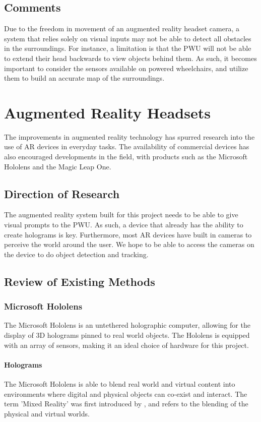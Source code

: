\subsection{Comments}
Due to the freedom in movement of an augmented reality headset camera, a system that relies solely on visual inputs may not be able to detect all obstacles in the surroundings. For instance, a limitation is that the PWU will not be able to extend their head backwards to view objects behind them. As such, it becomes important to consider the sensors available on powered wheelchairs, and utilize them to build an accurate map of the surroundings.

\section{Augmented Reality Headsets}
The improvements in augmented reality technology has spurred research into the use of AR devices in everyday tasks. The availability of commercial devices has also encouraged developments in the field, with products such as the Microsoft Hololens and the Magic Leap One.

\subsection{Direction of Research}
The augmented reality system built for this project needs to be able to give visual prompts to the PWU. As such, a device that already has the ability to create holograms is key. Furthermore, most AR devices have built in cameras to perceive the world around the user. We hope to be able to access the cameras on the device to do object detection and tracking.

\subsection{Review of Existing Methods}

\subsubsection{Microsoft Hololens}
The Microsoft Hololens is an untethered holographic computer, allowing for the display of 3D holograms pinned to real world objects. The Hololens is equipped with an array of sensors, making it an ideal choice of hardware for this project.

\paragraph{Holograms}The Microsoft Hololens is able to blend real world and virtual content into environments where digital and physical objects can co-exist and interact. The term 'Mixed Reality' was first introduced by \cite{Milgram1994}, and refers to the blending of the physical and virtual worlds.

